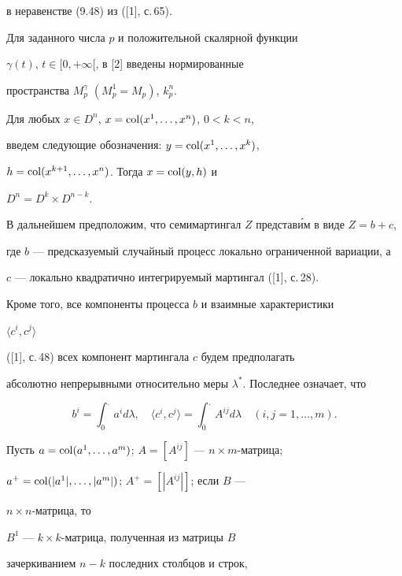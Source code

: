 в неравенстве (9.48) из ([1], с.\,65). 





Для заданного числа $p$ и положительной скалярной функции 


$\gamma (t)$, $t \in [0, +\infty [$, в [2] введены нормированные 


пространства $M_p^\gamma$ $(M_p^1 = M_p)$, $k_p^n$. 


Для любых $x \in D^n$, $x = \operatorname{col}(x^1,\dotsc, x^n)$, $0 < k < n$,


введем следующие обозначения: $y = \operatorname{col}(x^1,\dotsc, x^k)$, 


$h = \operatorname{col}(x^{k+1},\dotsc, x^n)$. Тогда $x = \operatorname{col}(y,h)$ и 


$D^n = D^k\times D^{n-k}$. 





В дальнейшем предположим, что семимартингал $Z$ представ\'им в виде $Z=b+c$, 


где $b$ --- предсказуемый случайный процесс локально ограниченной вариации, а 


$c$ --- локально квадратично интегрируемый мартингал ([1], с.\,28). 


Кроме того, все компоненты процесса $b$ и взаимные характеристики


$\langle c^i,c^j\rangle$ 


([1], с.\,48) всех компонент мартингала $c$ будем предполагать 


абсолютно непрерывными относительно меры $\lambda^*$. Последнее означает, что 


$$


b^i = \int_0^{\displaystyle.}a^i d\lambda,


\quad \langle c^i,c^j\rangle = \int_0^{\displaystyle .}


A^{ij}d\lambda\quad (i, j = 1,\dotsc, m). 


$$





Пусть $a = \operatorname{col} (a^1,\dotsc, a^m)$; $A = [A^{ij}]$ --- $n\times m$-матрица;


$a^+ = \operatorname{col}(|a^1|,\dotsc, |a^m|)$; $A^+ = [|A^{ij}|]$; если $B$ --- 


$n\times n$-матрица, то 


$B^1$ --- $k\times k$-матрица, полученная из матрицы $B$ 


зачеркиванием $n-k$ последних столбцов и строк, 


